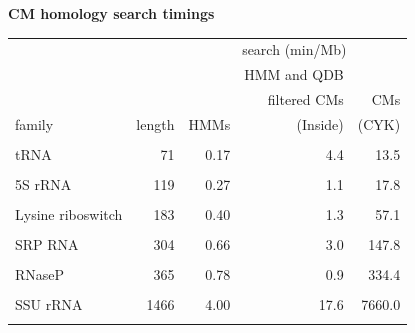 \documentclass[landscape]{slides}
\begin{document}

\begin{slide}
\begin{center}
\textbf{CM homology search timings}
\end{center}

\small
\begin{center}
\small
\begin{tabular}{lr|rrr}
                  &        & \multicolumn{3}{c}{search (min/Mb)}
\\  \cline {3-5}
                  &        &        & HMM and QDB     &     \\
                  &        &        & filtered CMs    & CMs \\
family            & length & HMMs   & (Inside)        & (CYK)  \\
                  &        &        &        &         \\
tRNA              & 71     &  0.17 &  4.4  &   13.5 \\
                  &        &        &        &         \\
5S rRNA           & 119    &  0.27 &  1.1  &   17.8 \\
                  &        &        &        &         \\
Lysine riboswitch & 183    &  0.40 &  1.3  &  57.1 \\
                  &        &        &        &         \\
SRP RNA           & 304    &  0.66 &  3.0  &  147.8 \\
                  &        &        &        &         \\
RNaseP            & 365    &  0.78 &  0.9  & 334.4  \\
                  &        &        &        &         \\
SSU rRNA          & 1466   &  4.00 & 17.6  &7660.0  \\
                  &        &        &        &         \\
\end{tabular}
\end{center}

\vfill

\end{slide}
\end{document}
